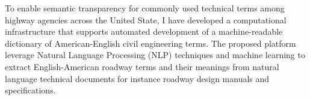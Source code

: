 \documentclass[a4paper,11pt]{article}
\begin{document}
%
%
%
%
To enable semantic transparency for commonly used technical terms among highway agencies across the United State, I have developed a computational infrastructure that supports automated development of a machine-readable dictionary of American-English civil engineering terms. 
%
The proposed platform leverage Natural Language Processing (NLP) techniques and machine learning to extract English-American roadway terms and their meanings from natural language technical documents for instance roadway design manuals and specifications.
%
\end{document}
